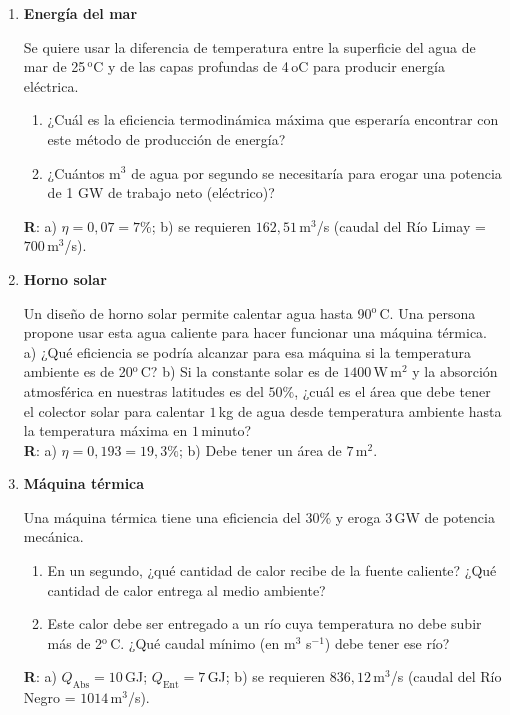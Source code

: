\documentclass[a4paper,12pt]{article}
\begin{document}
\begin{enumerate}
	\item {\bf{Energía del mar}}
		
		Se quiere usar la diferencia de temperatura entre la superficie del
		agua de mar de 25\,$^\mathrm{o}$C y de las capas profundas de
		4\,$\mathrm{o}$C para producir energía eléctrica.
		\begin{enumerate}
			\item ¿Cuál es la eficiencia termodinámica máxima que esperaría
				encontrar con este método de producción de energía?
			\item ¿Cuántos m$^3$ de agua por segundo se necesitaría para
				erogar una potencia de 1 GW de trabajo neto (eléctrico)?
		\end{enumerate}
		{\bf{R}}: a) $\eta=0,07 = 7\%$; b) se requieren $162,51$\,m$^3$/s
		(caudal del Río Limay = $700$\,m$^3$/s). 

	\item {\bf{Horno solar}}
		
		Un diseño de horno solar permite calentar agua hasta
		90$^\mathrm{o}$\,C. Una persona propone usar esta agua caliente para
		hacer funcionar una máquina térmica. a) ¿Qué eficiencia se podría alcanzar
		para esa máquina si la temperatura ambiente es de 20$^\mathrm{o}$\,C?
		b) Si la constante solar es de $1400$\,W\,m$^2$ y la absorción atmosférica
		en nuestras latitudes es del $50\%$, ¿cuál es el área que debe tener el
		colector solar para calentar $1$\,kg de agua desde temperatura ambiente
		hasta la temperatura máxima en $1$\,minuto?
		\\{\bf{R}}: a) $\eta=0,193 = 19,3\%$; b) Debe tener un área de
		$7$\,m$^2$. 
	
	\item {\bf{Máquina térmica}}
		
		Una máquina térmica tiene una eficiencia del 30\% y eroga $3$\,GW de
		potencia mecánica.
		\begin{enumerate}
			\item En un segundo, ¿qué cantidad de calor recibe de la fuente
				caliente? ¿Qué cantidad de calor entrega al medio ambiente?
			\item Este calor debe ser entregado a un río cuya temperatura no
				debe subir más de 2$^\mathrm{o}$\,C. ¿Qué caudal mínimo (en
				m$^3$ s$^{-1}$) debe tener ese río?
		\end{enumerate}
		{\bf{R}}: a) $Q_{\mathrm{Abs}}=10$\,GJ; $Q_{\mathrm{Ent}}=7$\,GJ; b) se
		requieren $836,12$\,m$^3$/s (caudal del Río Negro = $1014$\,m$^3$/s). 
	

\end{enumerate}
\end{document}
